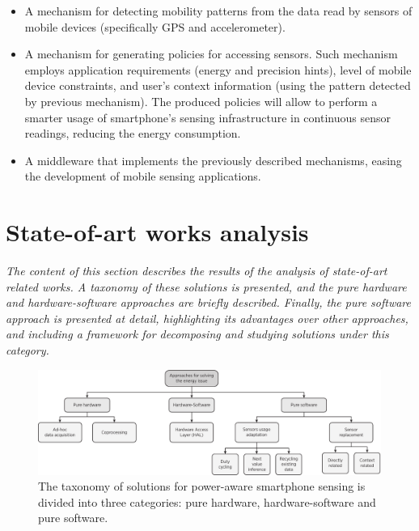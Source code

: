 \documentclass[ENG,PhD]{cinvestav}
\begin{document}
\begin{itemize}
  \item A mechanism for detecting mobility patterns from the data read by sensors of mobile devices (specifically GPS and accelerometer).
  \item A mechanism for generating policies for accessing sensors.
  Such mechanism employs application requirements (energy and precision hints), level of mobile device constraints, and user's context information (using the pattern detected by previous mechanism).
  The produced policies will allow to perform a smarter usage of smartphone's sensing infrastructure in continuous sensor readings, reducing the energy consumption.
  \item A middleware that implements the previously described mechanisms, easing the development of mobile sensing applications.
\end{itemize}










\section{State-of-art works analysis}
\label{sec:state-of-art}
\emph{The content of this section describes the results of the analysis of state-of-art related works. A taxonomy of these solutions is presented, and the pure hardware and hardware-software approaches are briefly described. Finally, the pure software approach is presented at detail, highlighting its advantages over other approaches, and including a framework for decomposing and studying solutions under this category.}


\begin{figure}[t]
  \centering
  \includegraphics[width=\textwidth]{approaches-taxonomy}
  \caption{The taxonomy of solutions for power-aware smartphone sensing is divided into three categories: pure hardware, hardware-software and pure software.}
  \label{fig:taxonomy-approaches}
\end{figure}
\end{document}

